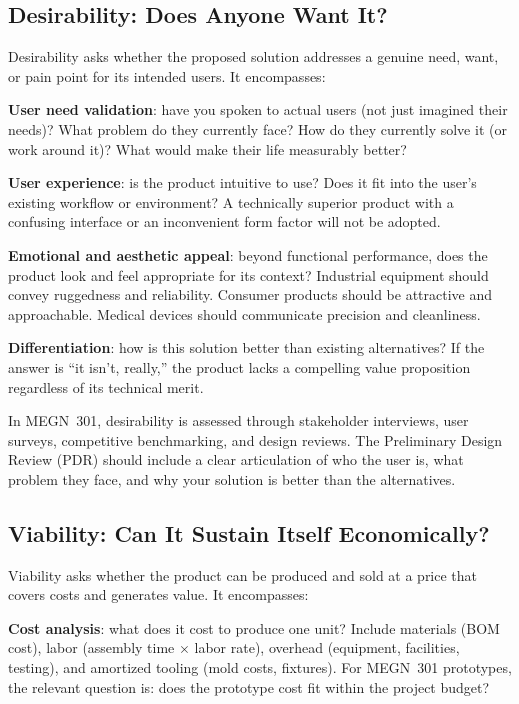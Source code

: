 \subsection{Desirability: Does Anyone Want It?}
Desirability asks whether the proposed solution addresses a genuine need, want, or pain point for its intended users. It encompasses:

\textbf{User need validation}: have you spoken to actual users (not just imagined their needs)? What problem do they currently face? How do they currently solve it (or work around it)? What would make their life measurably better?

\textbf{User experience}: is the product intuitive to use? Does it fit into the user's existing workflow or environment? A technically superior product with a confusing interface or an inconvenient form factor will not be adopted.

\textbf{Emotional and aesthetic appeal}: beyond functional performance, does the product look and feel appropriate for its context? Industrial equipment should convey ruggedness and reliability. Consumer products should be attractive and approachable. Medical devices should communicate precision and cleanliness.

\textbf{Differentiation}: how is this solution better than existing alternatives? If the answer is ``it isn't, really,'' the product lacks a compelling value proposition regardless of its technical merit.

In MEGN~301, desirability is assessed through stakeholder interviews, user surveys, competitive benchmarking, and design reviews. The Preliminary Design Review (PDR) should include a clear articulation of who the user is, what problem they face, and why your solution is better than the alternatives.

\subsection{Viability: Can It Sustain Itself Economically?}
Viability asks whether the product can be produced and sold at a price that covers costs and generates value. It encompasses:

\textbf{Cost analysis}: what does it cost to produce one unit? Include materials (BOM cost), labor (assembly time $\times$ labor rate), overhead (equipment, facilities, testing), and amortized tooling (mold costs, fixtures). For MEGN~301 prototypes, the relevant question is: does the prototype cost fit within the project budget?

